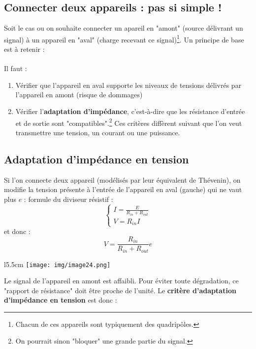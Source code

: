 \documentclass[british,french,11pt, a4paper, openany]{book}
\begin{document}
		\subsection{Connecter deux appareils : pas si simple !}
		Soit le cas ou on souhaite connecter un apareil en "amont" (source délivrant un signal) à un appareil en "aval" (charge recevant ce signal)\footnote{Chacun de ces appareils sont typiquement des quadripôles.}. Un principe de base est à retenir :\\
		\ \\
		
		Il faut :
		\begin{enumerate}
			\item Vérifier que l'appareil en aval supporte les niveaux de tensions délivrés par l'appareil en amont (risque de dommages)
			\item Vérifier l'\textbf{adaptation d'impédance}, c'est-à-dire que les résistance d'entrée et de sortie sont "compatibles".\footnote{On pourrait sinon "bloquer" une grande partie du signal.} Ces critères diffèrent suivant que l'on veut transmettre une tension, un courant ou une puissance.
		\end{enumerate}
		
		\subsection{Adaptation d'impédance en tension}
		Si l'on connecte deux appareil (modélisés par leur équivalent de Thévenin), on modifie la tension présente à l'entrée de l'appareil en aval (gauche) qui ne vaut plus $e$ : formule du diviseur résistif :
		\begin{equation}
		\left\{\begin{array}{l}
		I = \frac{E}{R_{in} + R_{out}}\\
		V = R_{in} I
		\end{array}\right.
		\end{equation}
		et donc : 
		\begin{equation}
		V = \frac{R_{in}}{R_{in} + R_{out}}e
		\end{equation}
		\begin{wrapfigure}[5]{l}{5.5cm}
			\texttt{[image: img/image24.png]}
		\end{wrapfigure}
		Le signal de l'appareil en amont est affaibli. Pour éviter toute dégradation, ce "rapport de résistance" doit être proche de l'unité. Le \textbf{critère d'adaptation d'impédance en tension} est donc :\\
		
\end{document}
